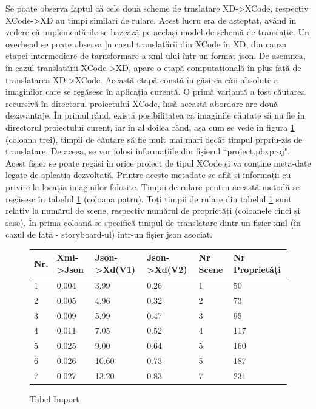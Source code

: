 Se poate observa faptul că cele două scheme de trnslatare XD->XCode, respectiv XCode->XD au timpi similari de rulare. Acest lucru era de așteptat, având în vedere că implementările se bazează pe același model de schemă de translație. Un overhead se poate observa ]n cazul translatării din XCode în XD, din cauza etapei intermediare de tarnsformare a xml-ului într-un format json. De asemnea, în cazul translatării XCode->XD, apare o etapă computațională în plus față de translatarea XD->XCode. Această etapă constă în găsirea căii absolute a imaginilor care se regăsesc în aplicația curentă. O primă variantă a fost căutarea recursivă în directorul proiectului XCode, însă această abordare are două dezavantaje. În primul rând, există posibilitatea ca imaginile căutate să nu fie în directorul proiectului curent, iar în al doilea rând, așa cum se vede în figura \ref{fig:Tabimport} (coloana trei), timpii de căutare să fie mult mai mari decât timpul prpriu-zis de translatare. De aceea, se vor folosi informațiile din fișierul ``project.pbxproj". Acest fișier se poate regăsi în orice proiect de tipul XCode și va conține meta-date legate de aplcația dezvoltată. Printre aceste metadate se află si informații cu privire la locația imaginilor folosite. Timpii de rulare pentru această metodă se regăsesc în tabelul \ref{fig:Tabimport} (coloana patru). Toți timpii de rulare din tabelul \ref{fig:Tabimport} sunt relativ la numărul de scene, respectiv numărul de proprietăți (coloanele cinci și șase). În prima coloană se specifică timpul de translatare dintr-un fișier xml (în cazul de față - storyboard-ul) într-un fișier json asociat.

\begin{figure}[!htbp]
\centering
\begin{center}
    \begin{tabular}{| l | l | l | l |l |l |}
    \hline
    Nr. & Xml->Json & Json->Xd(V1) & Json->Xd(V2) & Nr Scene & Nr Proprietăți\\ \hline
    1 & 0.004 & 3.99 & 0.26 & 1 & 50\\ \hline
    2 & 0.005 & 4.96 & 0.32 & 2 & 73\\ \hline
    3 & 0.009 & 5.99 & 0.47 & 3 & 95\\ \hline
    4 & 0.011 & 7.05 & 0.52 & 4 & 117\\ \hline
    5 & 0.025 & 9.00 & 0.64 & 5 & 160\\ \hline
    6 & 0.026 & 10.60 & 0.73 & 5 & 187\\ \hline
    7 & 0.027 & 13.20 & 0.83 & 7 & 231\\ \hline
    \end{tabular}
\end{center}
\caption{Tabel Import} \label{fig:Tabimport}
\end{figure}

